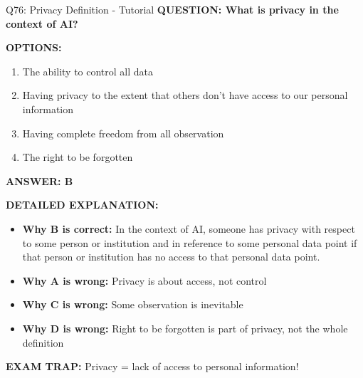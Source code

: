 \documentclass[8pt]{beamer}
\begin{document}
	\begin{frame}{Q76: Privacy Definition - Tutorial}
		\fontsize{6.5}{7.5}\selectfont
		\textbf{QUESTION: What is privacy in the context of AI?}
		
		\vspace{0.1cm}
		\textbf{OPTIONS:}
		\begin{enumerate}
			\item The ability to control all data
			\item Having privacy to the extent that others don't have access to our personal information
			\item Having complete freedom from all observation
			\item The right to be forgotten
		\end{enumerate}
		
		\vspace{0.1cm}
		\textcolor{myblue}{\textbf{ANSWER: B}}
		
		\vspace{0.1cm}
		\textbf{DETAILED EXPLANATION:}
		\begin{itemize}
			\item \textbf{Why B is correct:} In the context of AI, someone has privacy with respect to some person or institution and in reference to some personal data point if that person or institution has no access to that personal data point.
			\item \textbf{Why A is wrong:} Privacy is about access, not control
			\item \textbf{Why C is wrong:} Some observation is inevitable
			\item \textbf{Why D is wrong:} Right to be forgotten is part of privacy, not the whole definition
		\end{itemize}
		
		\textcolor{myred}{\textbf{EXAM TRAP:}} Privacy = \textcolor{myblue}{lack of access to personal information}!
	\end{frame}
	
\end{document}
